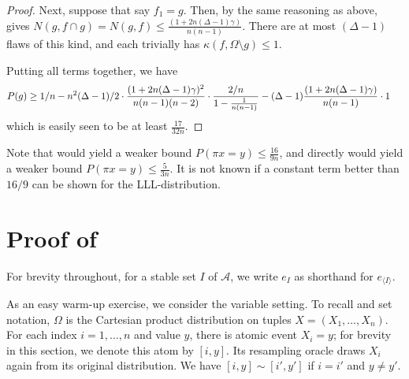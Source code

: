 \documentclass{toc}
\begin{document}
\begin{proof}
Next, suppose that say $f_1 = g$. Then, by the same reasoning as above,   gives $N( g, f \cap g) = N( g, f) \leq \frac{(1 + 2 n (\Delta - 1) \gamma)}{n(n-1)}$. There are at most $(\Delta-1)$ flaws of this kind, and each trivially has $\kappa(f, \Omega \setminus g) \leq 1$.   

    Putting all terms together, we have
 \begin{align*}
  &P(g)  \geq 1/n  -  n^2 (\Delta-1)/2  \cdot \frac{ (1 + 2 n (\Delta - 1) \gamma)^2}{n(n-1)(n-2)} \cdot \frac{ 2/n }{1 - \frac{1}{n(n-1)} } -  (\Delta-1) \frac{ (1 + 2 n (\Delta - 1) \gamma)}{n(n-1)} \cdot 1 \thickspace
  \end{align*}
  which is easily seen to be at least $\frac{17}{32 n}$. 
  \end{proof}
  
  
  Note that  would yield a weaker bound $P( \pi x = y) \leq \frac{16}{9 n}$, and  directly would yield a weaker bound $P( \pi x = y) \leq \frac{5}{3 n}$. It is not known if a constant term better than $16/9$ can be shown for the LLL-distribution.

 

  
\appendix



\section{Proof of }
\label{perm-app}
For brevity throughout, for a stable set $I$ of $\mathcal A$, we write $e_I$ as shorthand for $e_{\langle I \rangle}$.

 As an easy warm-up exercise, we consider the variable setting. To recall and set notation, $\Omega$ is the Cartesian product distribution on tuples $X = (X_1, \dots, X_n)$. For each index $i = 1, \dots, n$ and value $y$, there is atomic event $X_i = y$; for brevity in this section, we denote this atom by $[i, y]$. Its resampling oracle draws $X_i$ again from its original distribution. We have $[i,y] \sim [i', y']$ if $i = i'$ and $y \neq y'$.
\end{document}
